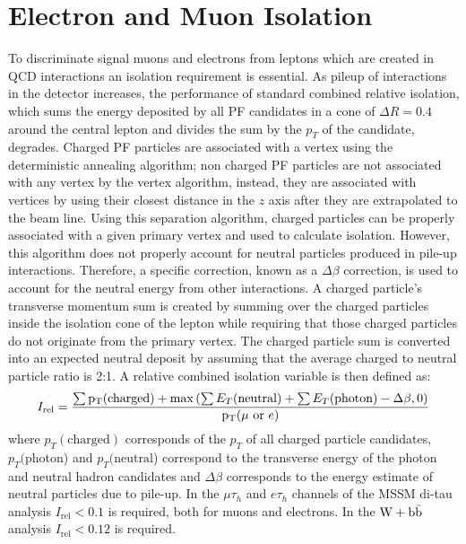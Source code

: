 \section{Electron and Muon Isolation}
To discriminate signal muons and electrons from leptons
which are created in QCD interactions an isolation requirement is essential. 
As pileup of interactions in the detector increases, the performance of standard
combined relative isolation, which sums the 
energy deposited by all PF candidates in a cone of $\Delta R = 0.4$ around the central
lepton and divides the sum by the $p_{T}$ of 
the candidate, degrades. Charged PF particles are associated with 
a vertex using the deterministic annealing algorithm; non charged PF particles
are not associated with any vertex by the vertex algorithm, instead,
they are associated with vertices by using their closest distance in the
$z$ axis after they are extrapolated to the beam line. Using this separation algorithm,
charged particles can be properly associated with a given primary vertex
and used to calculate isolation. However, this algorithm does not
properly account for neutral particles produced in pile-up interactions. 
Therefore, a specific correction, known as a $\Delta \beta$ correction, is
used to account for the neutral energy from other interactions.
A charged particle's transverse momentum sum is created by summing over
the charged particles inside the isolation cone of the lepton while %
requiring that those charged particles do not originate from the primary vertex.
The charged particle sum is converted into an expected neutral deposit by
assuming that the average charged to neutral particle ratio is 2:1.
A relative combined isolation variable is then defined as:
\begin{equation}
I_{\rm rel} = \frac{\sum{\mathrm{p_{T}}(\mathrm{charged})} + \max\left(\sum{E_{T}(\mathrm{neutral})} + \sum{E_{T}(\mathrm{photon})} - \Delta\beta, 0\right)}{\mathrm{p_{T}}(\mu \, \, \mathrm{or} \,\, e)}
\label{eq:relIso}
\end{equation}
where $p_{T}(\mathrm{charged})$ corresponds of the $p_{T}$ 
of all charged particle candidates, $p_{T}(\mathrm{photon}$)
and $p_{T}(\mathrm{neutral}$) correspond to the transverse 
energy of the photon and neutral hadron candidates
and $\Delta\beta$ corresponds to the energy estimate of neutral particles due to pile-up.
In the $\mu\tau_{h}$ and $e\tau_{h}$ channels of the MSSM di-tau 
analysis $I_{\mathrm{rel}}<0.1$ is required, both for muons and electrons. In the $\mathrm{W+\mathrm{b\bar{b}}}$
analysis $I_{\mathrm{rel}}<0.12$ is required. 


